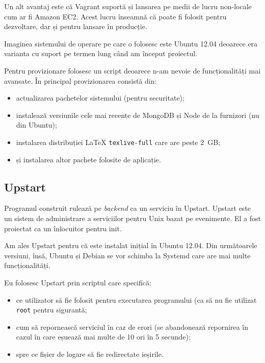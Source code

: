 \documentclass[a4wide,12pt]{report}
\newcommand{\eng}[1]{\emph{#1}} %
\newcommand{\cod}[1]{\texttt{#1}}
\begin{document}
Un alt avantaj este că Vagrant suportă și lansarea pe medii de lucru non-locale
cum ar fi Amazon EC2. Acest lucru înseamnă că poate fi folosit pentru
dezvoltare, dar și pentru lansare în producție.

Imaginea sistemului de operare pe care o folosesc este Ubuntu 12.04 deoarece era
varianta cu suport pe termen lung când am început proiectul.

Pentru provizionare folosesc un script deoarece n-am nevoie de funcționalități
mai avansate. În principal provizionarea consistă din:

\begin{itemize}

\item actualizarea pachetelor sistemului (pentru securitate);

\item instalează versiunile cele mai recente de MongoDB și Node de la furnizori
(nu din Ubuntu);

\item instalarea distribuției \LaTeX{} \cod{texlive-full} care are peste 2~GB;

\item și instalarea altor pachete folosite de aplicație.

\end{itemize}

\subsection{Upstart}

Programul construit rulează pe \eng{backend} ca un serviciu în Upstart. Upstart
este un sistem de administrare a serviciilor pentru Unix bazat pe evenimente. El
a fost proiectat ca un înlocuitor pentru init.

Am ales Upstart pentru că este instalat inițial în Ubuntu 12.04. Din următoarele
versiuni, însă, Ubuntu și Debian se vor schimba la Systemd care are mai multe
funcționalități.

Eu folosesc Upstart prin scriptul care specifică:

\begin{itemize}

\item ce utilizator să fie folosit pentru executarea programului (ca să nu fie
utilizat \cod{root} pentru sigurantă;

\item cum să repornească serviciul în caz de erori (se abandonează repornirea în
cazul în care eșuează mai multe de 10 ori în 5 secunde);

\item spre ce fișier de logare să fie redirectate ieșirile.

\end{itemize}
\end{document}
